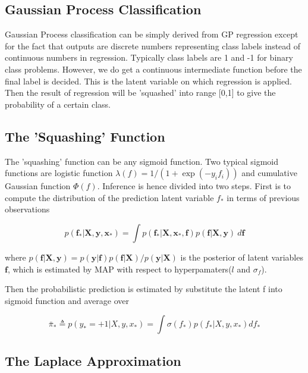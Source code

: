 \documentclass[14pt]{report}
\numberwithin{equation}{chapter}
\begin{document}
\begin{spacing}{2}
\section{Gaussian Process Classification}
Gaussian Process classification can be simply derived from GP regression except for the fact that outputs are discrete numbers representing class labels instead of continuous numbers in regression. Typically class labels are 1 and -1 for binary class problems. However, we do get a continuous intermediate function before the final label is decided. This is the latent variable on which regression is applied. Then the result of regression will be 'squashed' into range [0,1] to give the probability of a certain class.


\subsection{The 'Squashing' Function}
The 'squashing' function can be any sigmoid function. Two typical sigmoid functions are logistic function $\lambda (f) = 1/(1 + \operatorname{exp}(-y_if_i))$ and cumulative Gaussian function $\Phi (f) $. Inference is hence divided into two steps. First is to compute  the distribution of the prediction latent variable $f_*$ in terms of previous observations 

\begin{equation}
\label{classification_prediction}
p(\boldsymbol f_*|\boldsymbol X,\boldsymbol y,\boldsymbol x_*) = \int p(\boldsymbol f_*|\boldsymbol X,\boldsymbol x_*,\boldsymbol f)p(\boldsymbol f|\boldsymbol X,\boldsymbol y)\ d\boldsymbol f
\end{equation}

where \(p(\boldsymbol f|\boldsymbol X,\boldsymbol y) = {p(\boldsymbol y|\boldsymbol f)p(\boldsymbol f|\boldsymbol X)}/{p(\boldsymbol y|\boldsymbol X)}\) is the posterior of latent variables $\boldsymbol f$, which is estimated by MAP with respect to hyperpamaters($l$ and $\sigma_f$).

Then the probabilistic prediction is estimated by substitute the latent f into sigmoid function and average over 

\begin{equation}
\label{predictive_probability}
\bar{\pi}_* \triangleq p(y_* = +1|X,y,x_*) = \int \sigma (f_*)p(f_*|X,y,x_*) df_*
\end{equation}


\subsection{The Laplace Approximation}


\end{spacing}
\end{document}
